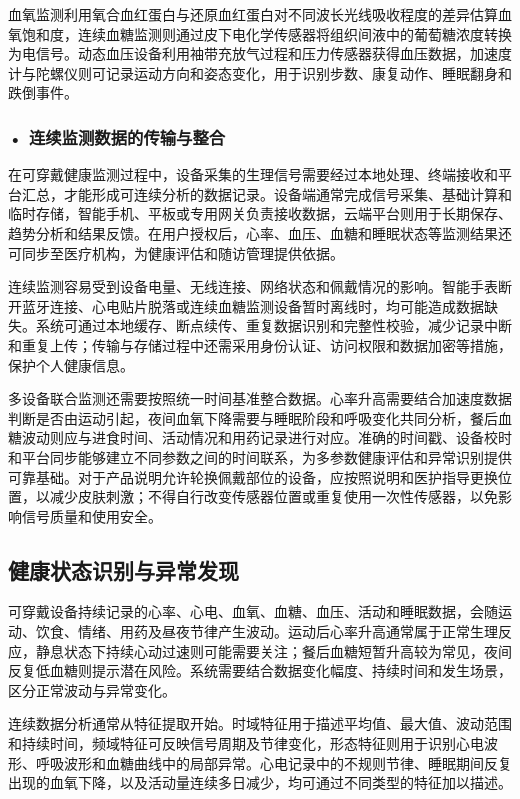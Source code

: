 血氧监测利用氧合血红蛋白与还原血红蛋白对不同波长光线吸收程度的差异估算血氧饱和度，连续血糖监测则通过皮下电化学传感器将组织间液中的葡萄糖浓度转换为电信号。动态血压设备利用袖带充放气过程和压力传感器获得血压数据，加速度计与陀螺仪则可记录运动方向和姿态变化，用于识别步数、康复动作、睡眠翻身和跌倒事件。

\subsubsection*{\textbf{• 连续监测数据的传输与整合}}

在可穿戴健康监测过程中，设备采集的生理信号需要经过本地处理、终端接收和平台汇总，才能形成可连续分析的数据记录。设备端通常完成信号采集、基础计算和临时存储，智能手机、平板或专用网关负责接收数据，云端平台则用于长期保存、趋势分析和结果反馈。在用户授权后，心率、血压、血糖和睡眠状态等监测结果还可同步至医疗机构，为健康评估和随访管理提供依据。

连续监测容易受到设备电量、无线连接、网络状态和佩戴情况的影响。智能手表断开蓝牙连接、心电贴片脱落或连续血糖监测设备暂时离线时，均可能造成数据缺失。系统可通过本地缓存、断点续传、重复数据识别和完整性校验，减少记录中断和重复上传；传输与存储过程中还需采用身份认证、访问权限和数据加密等措施，保护个人健康信息。

多设备联合监测还需要按照统一时间基准整合数据。心率升高需要结合加速度数据判断是否由运动引起，夜间血氧下降需要与睡眠阶段和呼吸变化共同分析，餐后血糖波动则应与进食时间、活动情况和用药记录进行对应。准确的时间戳、设备校时和平台同步能够建立不同参数之间的时间联系，为多参数健康评估和异常识别提供可靠基础。对于产品说明允许轮换佩戴部位的设备，应按照说明和医护指导更换位置，以减少皮肤刺激；不得自行改变传感器位置或重复使用一次性传感器，以免影响信号质量和使用安全。

\subsection{健康状态识别与异常发现}

可穿戴设备持续记录的心率、心电、血氧、血糖、血压、活动和睡眠数据，会随运动、饮食、情绪、用药及昼夜节律产生波动。运动后心率升高通常属于正常生理反应，静息状态下持续心动过速则可能需要关注；餐后血糖短暂升高较为常见，夜间反复低血糖则提示潜在风险。系统需要结合数据变化幅度、持续时间和发生场景，区分正常波动与异常变化。

连续数据分析通常从特征提取开始。时域特征用于描述平均值、最大值、波动范围和持续时间，频域特征可反映信号周期及节律变化，形态特征则用于识别心电波形、呼吸波形和血糖曲线中的局部异常。心电记录中的不规则节律、睡眠期间反复出现的血氧下降，以及活动量连续多日减少，均可通过不同类型的特征加以描述。

